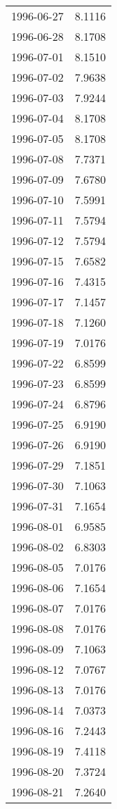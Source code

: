 \begin{tabular}{lr}
1996-06-27 &      8.1116 \\
1996-06-28 &      8.1708 \\
1996-07-01 &      8.1510 \\
1996-07-02 &      7.9638 \\
1996-07-03 &      7.9244 \\
1996-07-04 &      8.1708 \\
1996-07-05 &      8.1708 \\
1996-07-08 &      7.7371 \\
1996-07-09 &      7.6780 \\
1996-07-10 &      7.5991 \\
1996-07-11 &      7.5794 \\
1996-07-12 &      7.5794 \\
1996-07-15 &      7.6582 \\
1996-07-16 &      7.4315 \\
1996-07-17 &      7.1457 \\
1996-07-18 &      7.1260 \\
1996-07-19 &      7.0176 \\
1996-07-22 &      6.8599 \\
1996-07-23 &      6.8599 \\
1996-07-24 &      6.8796 \\
1996-07-25 &      6.9190 \\
1996-07-26 &      6.9190 \\
1996-07-29 &      7.1851 \\
1996-07-30 &      7.1063 \\
1996-07-31 &      7.1654 \\
1996-08-01 &      6.9585 \\
1996-08-02 &      6.8303 \\
1996-08-05 &      7.0176 \\
1996-08-06 &      7.1654 \\
1996-08-07 &      7.0176 \\
1996-08-08 &      7.0176 \\
1996-08-09 &      7.1063 \\
1996-08-12 &      7.0767 \\
1996-08-13 &      7.0176 \\
1996-08-14 &      7.0373 \\
1996-08-16 &      7.2443 \\
1996-08-19 &      7.4118 \\
1996-08-20 &      7.3724 \\
1996-08-21 &      7.2640 \\

\end{tabular}
